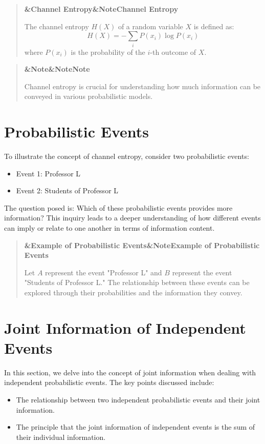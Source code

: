 \documentclass[a4paper]{article}
\newcommand{\boxheading}[1]{%
  \par\smallskip
  \noindent\textbf{\ifx&#1&Note\else#1\fi}\par
  \smallskip
}
\newenvironment{defbox}[1][]{%
  \begin{quote}\color{green!40!black}\boxheading{#1}\normalcolor
}{\end{quote}}
\newenvironment{exbox}[1][]{%
  \begin{quote}\color{brown!70!black}\boxheading{#1}\normalcolor
}{\end{quote}}
\newenvironment{rembox}[1][]{%
  \begin{quote}\color{black!70}\boxheading{#1}\normalcolor
}{\end{quote}}
\begin{document}
\begin{defbox}[Channel Entropy]
The channel entropy \( H(X) \) of a random variable \( X \) is defined as:
\begin{equation}
H(X) = -\sum_{i} P(x_i) \log P(x_i)
\end{equation}
where \( P(x_i) \) is the probability of the \( i \)-th outcome of \( X \).
\end{defbox}

\begin{rembox}[Note]
Channel entropy is crucial for understanding how much information can be conveyed in various probabilistic models.
\end{rembox}

\section{Probabilistic Events}
To illustrate the concept of channel entropy, consider two probabilistic events:
\begin{itemize}
    \item Event 1: Professor L
    \item Event 2: Students of Professor L
\end{itemize}

The question posed is: Which of these probabilistic events provides more information? This inquiry leads to a deeper understanding of how different events can imply or relate to one another in terms of information content.

\begin{exbox}[Example of Probabilistic Events]
Let \( A \) represent the event "Professor L" and \( B \) represent the event "Students of Professor L." The relationship between these events can be explored through their probabilities and the information they convey.
\end{exbox}

\section{Joint Information of Independent Events}
In this section, we delve into the concept of joint information when dealing with independent probabilistic events. The key points discussed include:

\begin{itemize}
    \item The relationship between two independent probabilistic events and their joint information.
    \item The principle that the joint information of independent events is the sum of their individual information.
\end{itemize}
\end{document}
